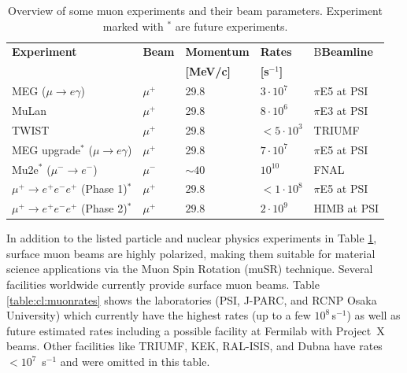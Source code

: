 \begin{table}[ht]
\begin{center}
\caption{Overview of some muon experiments and their beam parameters. Experiment marked with $^*$ are future experiments.\label{table:cl:muonexperiments}}
{ \begin{tabular}{lllll}\\
\hline
{\bf Experiment} & {\bf Beam} & {\bf Momentum} & {\bf Rates} & B{\bf Beamline}\\
{\bf } & {\bf } & {\bf [MeV/c]} & {\bf [s$^{-1}$]} & \\
\hline
MEG ($\mu\to e\gamma$) \cite{Adam:2013} & $\mu^+$ & 29.8 & $3 \cdot 10^7$ & $\pi$E5 at PSI\\
\hline
MuLan \cite{Tishchenko:2012ie} & $\mu^+$ & 29.8 & $8 \cdot 10^6$ & $\pi$E3 at PSI\\
\hline
TWIST \cite{Hillairet:2012} & $\mu^+$ & 29.8 & $<5 \cdot 10^3$ & TRIUMF\\
\hline
MEG upgrade$^*$ ($\mu\to e\gamma$) \cite{Baldini:2013ke} & $\mu^+$ & 29.8 & $7 \cdot 10^7$ & $\pi$E5 at PSI\\
\hline
Mu2e$^*$ ($\mu^- \to e^-$) \cite{Abrams:2012er} & $\mu^-$ & $\sim 40$ & $10^{10}$ & FNAL\\
\hline
$\mu^+ \to e^+e^-e^+$ (Phase 1)$^*$ \cite{Blondel:2013ia} & $\mu^+$ & $29.8$ & $<1 \cdot 10^8$ & $\pi$E5 at PSI\\
\hline
$\mu^+ \to e^+e^-e^+$ (Phase 2)$^*$ \cite{Blondel:2013ia} & $\mu^+$ & $29.8$ & $2 \cdot 10^9$ & HIMB at PSI\\
\hline
\end{tabular}}
\end{center}
\end{table}

In addition to the listed particle and nuclear physics experiments in Table \ref{table:cl:muonexperiments}, surface muon beams are highly polarized, making them suitable for material science applications via the Muon Spin Rotation (muSR) technique. Several facilities worldwide currently provide surface muon beams. Table \ref{table:cl:muonrates} shows the laboratories (PSI, J-PARC, and RCNP Osaka University) which currently have the highest rates (up to a few $10^8$\,s$^{-1}$) as well as future estimated rates including a possible facility at Fermilab with Project~X beams. Other facilities like TRIUMF, KEK, RAL-ISIS, and Dubna have rates $< 10^7$ \,s$^{-1}$ and were omitted in this table.

